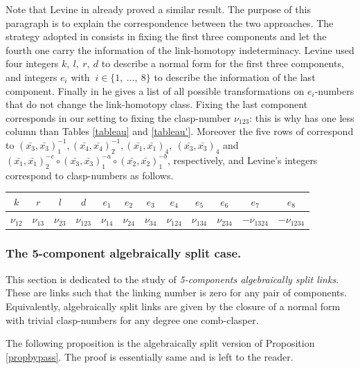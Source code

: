 \documentclass[11pt, a4paper, twoside,reqno]{amsart}
\begin{document}
Note that Levine in \cite{Levine4comp} already proved a similar result. The purpose of this paragraph is to explain the correspondence between the two approaches. The strategy adopted in \cite{Levine4comp} consists in fixing the first three components and let the fourth one carry the information of the link-homotopy indeterminacy. Levine used four integers $k,\ l,\ r,\ d$ to describe a normal form for the first three components, and integers $e_i$ with $\ i\in\{1,\ \ldots,\ 8\}$ to describe the information of the last component. Finally in \cite[Table3]{Levine4comp} he gives a list of all possible transformations on $e_i$-numbers that do not change the link-homotopy class. Fixing the last component corresponds in our setting to fixing the clasp-number $\nu_{123}$: this is why \cite[Table 3]{Levine4comp} has one less column than Tables \ref{tableau} and \ref{tableau'}. Moreover the five rows of \cite[Table 3]{Levine4comp} correspond to $(\bar{x_3},\bar{x_3})_1^{-1},(\bar{x_4},\bar{x_4})_2^{-1},(\bar{x_1},\bar{x_1})_4,\ (\bar{x_3},\bar{x_3})_4$ and $(\bar{x_1},\bar{x_1})_2^{-c}\circ(\bar{x_3},\bar{x_3})_1^{-a}\circ(\bar{x_2},\bar{x_2})_1^{-b}$, respectively, and Levine's integers correspond to clasp-numbers as follows.
\begin{table}[!htbp]
    \centering
    \begin{tabular}{|c|c|c|c|c|c|c|c|c|c|c|c|}
         \hline
         $k$ & $r$ & $l$ & $d$ & $e_1$ &  $e_2$ & $e_3$ & $e_4$ & $e_5$ & $e_6$ & $e_7$ & $e_8$ \\
         \hline
         $\nu_{12}$& $\nu_{13}$&$\nu_{23}$&$\nu_{123}$&$\nu_{14}$&$\nu_{24}$&$\nu_{34}$&$\nu_{124}$&$\nu_{134}$&$\nu_{234}$&$-\nu_{1324}$&$-\nu_{1234}$\\
         \hline
    \end{tabular}
    \label{tablelevine}
\end{table}
\subsubsection{The 5-component algebraically split case.}

This section is dedicated to the study of \emph{5-components algebraically split links}. These are links such that the linking number is zero for any pair of components. Equivalently, algebraically split links are given by the closure of a normal form with trivial clasp-numbers for any degree one comb-clasper.

The following proposition is the algebraically split version of Proposition \ref{propbypass}. The proof is essentially same and is left to the reader.
\end{document}
